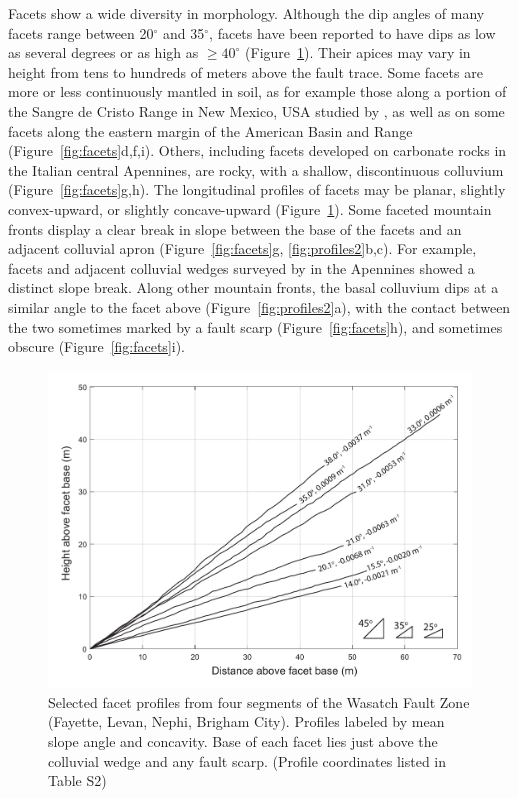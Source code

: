 Facets show a wide diversity in morphology. Although the dip angles of many facets range between 20$^\circ$ and 35$^\circ$, facets have been reported to have dips as low as several degrees \citep[e.g.,][]{menges1990soils} or as high as $\ge40^\circ$ \citep[e.g.,][]{wilkinson2015slip} (Figure~\ref{fig:profiles1}). Their apices may vary in height from tens to hundreds of meters above the fault trace. Some facets are more or less continuously mantled in soil, as for example those along a portion of the Sangre de Cristo Range in New Mexico, USA studied by \citet{menges1990soils}, as well as on some facets along the eastern margin of the American Basin and Range (Figure~\ref{fig:facets}d,f,i). Others, including facets developed on carbonate rocks in the Italian central Apennines, are rocky, with a shallow, discontinuous colluvium \citep{tucker2011geomorphic} (Figure~\ref{fig:facets}g,h). The longitudinal profiles of facets may be planar, slightly convex-upward, or slightly concave-upward (Figure~\ref{fig:profiles1}). Some faceted mountain fronts display a clear break in slope between the base of the facets and an adjacent colluvial apron (Figure~\ref{fig:facets}g, \ref{fig:profiles2}b,c). For example, facets and adjacent colluvial wedges surveyed by \citet{bubeck2015tectonic} in the Apennines showed a distinct slope break. Along other mountain fronts, the basal colluvium dips at a similar angle to the facet above (Figure~\ref{fig:profiles2}a), with the contact between the two sometimes marked by a fault scarp (Figure~\ref{fig:facets}h), and sometimes obscure (Figure~\ref{fig:facets}i).

\begin{figure}[ht!]
\centerline{\includegraphics[width=6in]{Figures/FacetShape_bw_trimmed.pdf}}
\caption{Selected facet profiles from four segments of the
Wasatch Fault Zone (Fayette, Levan, Nephi, Brigham City). Profiles
labeled by mean slope angle and concavity. Base of each facet lies just 
above the colluvial wedge and any fault scarp. (Profile coordinates listed in Table S2)}
\label{fig:profiles1}
\end{figure}

